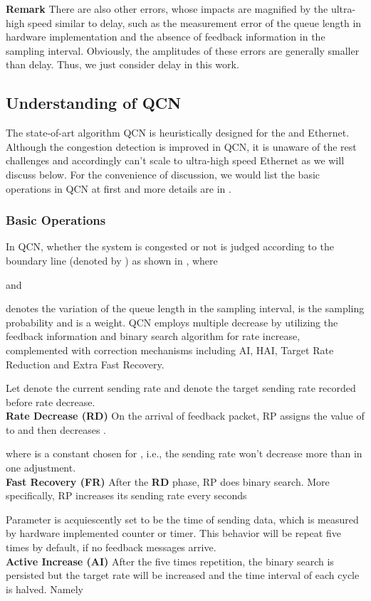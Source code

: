 \documentclass{sig-alternate-10pt}
\begin{document}
\textbf{Remark} There are also other errors, whose impacts are magnified by the ultra-high speed similar to delay, such as the measurement error of the queue length in hardware implementation and the absence of feedback information in the sampling interval. Obviously, the amplitudes of these errors are generally smaller than delay. Thus, we just consider delay in this work.



\subsection{Understanding of QCN} The state-of-art algorithm QCN is heuristically designed for the  and  Ethernet. Although the congestion detection is improved in QCN, it is unaware of the rest challenges and accordingly can't scale to ultra-high speed Ethernet as we will discuss below. For the convenience of discussion, we would list the basic operations in QCN at first and more details are in . 

\subsubsection{Basic Operations}
In QCN, whether the system is congested or not is judged according to the boundary line  (denoted by ) as shown in , where 

and 

 denotes the variation of the queue length in the sampling interval,  is the sampling probability and  is a weight. QCN employs multiple decrease by utilizing the feedback information and binary search algorithm for rate increase, complemented with correction mechanisms including AI, HAI, Target Rate Reduction and Extra Fast Recovery.

Let  denote the current sending rate and  denote the target sending rate recorded before rate decrease.
\\
\textbf{Rate Decrease (RD)} On the arrival of feedback packet, RP assigns the value of  to  and then decreases . 

where  is a constant chosen for , i.e., the sending rate won't decrease more than  in one adjustment.
\\
\textbf{Fast Recovery (FR)} After the \textbf{RD} phase, RP does binary search. More specifically, RP increases its sending rate  every  seconds 

Parameter  is acquiescently set to be the time of sending  data, which is measured by hardware implemented counter or timer. This behavior will be repeat five times by default, if no feedback messages arrive. 
\\
\textbf{Active Increase (AI)}
After the five times repetition, the binary search is persisted but the target rate  will be increased and the time interval of each cycle is halved. Namely
\end{document}
